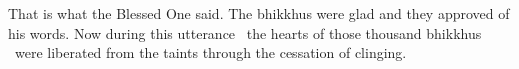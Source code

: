 \clearpage

\begin{english-only-hang}
  That is what the Blessed One said. The bhikkhus were glad and they approved of his words. Now during this utterance \breathmark\ the hearts of those thousand bhikkhus \breathmark\ were liberated from the taints through the cessation of clinging.
\end{english-only-hang}

\suttaRef{[SN 35.28]}

\endgroup
